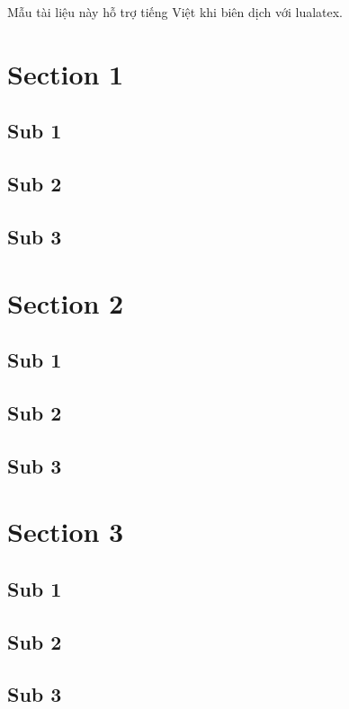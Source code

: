 \documentclass[10pt]{article}
\begin{document}
\tableofcontents
\listoffigures
\listoftables

\newpage

Mẫu tài liệu này hỗ trợ tiếng Việt khi biên dịch với lualatex.

\section{Section 1}
\blindtext
\subsection{Sub 1}
\blindtext
\subsection{Sub 2}
\blindtext
\subsection{Sub 3}
\blindtext

\section{Section 2}
\blindtext
\subsection{Sub 1}
\blindtext
\subsection{Sub 2}
\blindtext
\subsection{Sub 3}
\blindtext

\section{Section 3}
\blindtext
\subsection{Sub 1}
\blindtext
\subsection{Sub 2}
\blindtext
\subsection{Sub 3}
\blindtext

\newpage
\printbibliography
\end{document}
